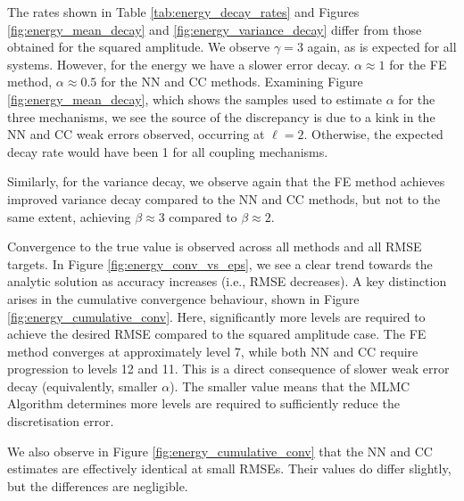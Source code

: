 The rates shown in Table \ref{tab:energy_decay_rates} and Figures 
\ref{fig:energy_mean_decay} and \ref{fig:energy_variance_decay} 
differ from those obtained for the squared amplitude. 
We observe $\gamma = 3$ again, as is expected for all systems. However, 
for the energy we have a slower error decay. $\alpha \approx 1$ for the 
FE method, $\alpha \approx 0.5$ for the NN and CC methods. Examining 
Figure \ref{fig:energy_mean_decay}, which shows the samples used to estimate 
$\alpha$ for the three mechanisms, we see the source of the discrepancy is 
due to a kink in the NN and CC weak errors observed, occurring at $\ell = 2$. 
Otherwise, the expected decay rate would have been 1 for all coupling mechanisms.

Similarly, for the variance decay, we observe again that the FE method
achieves improved variance decay compared to the NN and CC methods, but 
not to the same extent, achieving $\beta \approx 3$ compared to 
$\beta \approx 2$.


Convergence to the true value is observed across all methods 
and all RMSE targets. In Figure \ref{fig:energy_conv_vs_eps}, 
we see a clear trend towards the analytic 
solution as accuracy increases (i.e., RMSE decreases). A key 
distinction arises in 
the cumulative convergence behaviour, shown in Figure 
\ref{fig:energy_cumulative_conv}. Here, significantly more levels 
are required to achieve the desired RMSE compared to the squared
amplitude case. The FE method converges at approximately 
level 7, while both NN and CC require progression to levels 
12 and 11. This is a direct consequence of slower 
weak error decay (equivalently, smaller $\alpha$). 
The smaller value means that the MLMC Algorithm determines more levels 
are required to sufficiently reduce the discretisation error.

We also observe in Figure \ref{fig:energy_cumulative_conv} that the
NN and CC estimates are effectively identical
at small RMSEs. Their values 
do differ slightly, but the differences 
are negligible.
